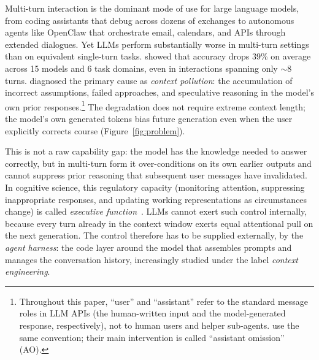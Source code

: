 \documentclass{article}
\begin{document}
Multi-turn interaction is the dominant mode of use for large language models, from coding assistants that debug across dozens of exchanges to autonomous agents like OpenClaw that orchestrate email, calendars, and APIs through extended dialogues. Yet LLMs perform substantially worse in multi-turn settings than on equivalent single-turn tasks. \citet{laban2025lost} showed that accuracy drops 39\% on average across 15 models and 6 task domains, even in interactions spanning only $\sim$8 turns. \citet{huang2026context} diagnosed the primary cause as \emph{context pollution}: the accumulation of incorrect assumptions, failed approaches, and speculative reasoning in the model's own prior responses.\footnote{Throughout this paper, ``user'' and ``assistant'' refer to the standard message roles in LLM APIs (the human-written input and the model-generated response, respectively), not to human users and helper sub-agents. \citet{huang2026context} use the same convention; their main intervention is called ``assistant omission'' (AO).} The degradation does not require extreme context length; the model's own generated tokens bias future generation even when the user explicitly corrects course (Figure~\ref{fig:problem}).

This is not a raw capability gap: the model has the knowledge needed to answer correctly, but in multi-turn form it over-conditions on its own earlier outputs and cannot suppress prior reasoning that subsequent user messages have invalidated. In cognitive science, this regulatory capacity (monitoring attention, suppressing inappropriate responses, and updating working representations as circumstances change) is called \emph{executive function}~\citep{miyake2000unity,diamond2013executive}. LLMs cannot exert such control internally, because every turn already in the context window exerts equal attentional pull on the next generation. The control therefore has to be supplied externally, by the \emph{agent harness}: the code layer around the model that assembles prompts and manages the conversation history, increasingly studied under the label \emph{context engineering}.
\end{document}
